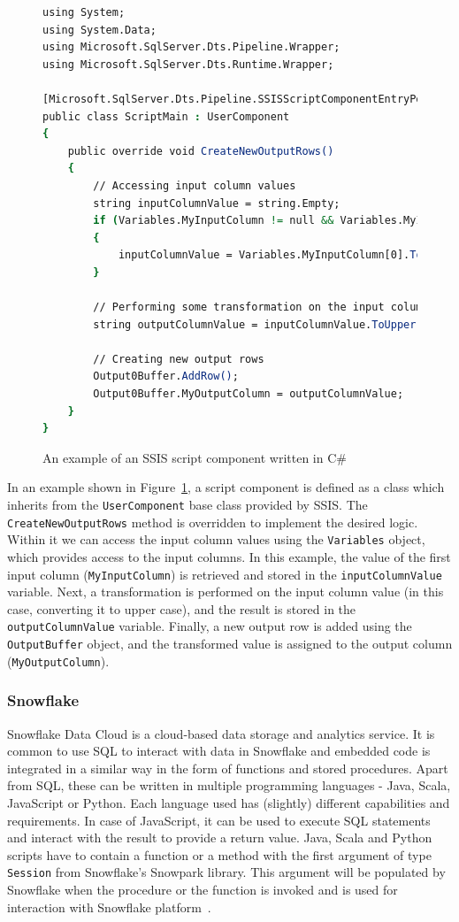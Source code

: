 \begin{figure}[ht]
\begin{lstlisting}[language=csh]
using System;
using System.Data;
using Microsoft.SqlServer.Dts.Pipeline.Wrapper;
using Microsoft.SqlServer.Dts.Runtime.Wrapper;

[Microsoft.SqlServer.Dts.Pipeline.SSISScriptComponentEntryPointAttribute]
public class ScriptMain : UserComponent
{
    public override void CreateNewOutputRows()
    {
        // Accessing input column values
        string inputColumnValue = string.Empty;
        if (Variables.MyInputColumn != null && Variables.MyInputColumn.Length > 0)
        {
            inputColumnValue = Variables.MyInputColumn[0].ToString();
        }

        // Performing some transformation on the input column value
        string outputColumnValue = inputColumnValue.ToUpper();

        // Creating new output rows
        Output0Buffer.AddRow();
        Output0Buffer.MyOutputColumn = outputColumnValue;
    }
}
\end{lstlisting}
\caption{An example of an SSIS script component written in C\#}
\label{fig:cSharpScript}
\end{figure}

\par
In an example shown in Figure~\ref{fig:cSharpScript}, a script component is defined as a class which inherits from the \texttt{UserComponent} base class provided by SSIS. The \texttt{CreateNewOutputRows} method is overridden to implement the desired logic. Within it we can access the input column values using the \texttt{Variables} object, which provides access to the input columns. In this example, the value of the first input column (\texttt{MyInputColumn}) is retrieved and stored in the \texttt{inputColumnValue} variable. Next, a transformation is performed on the input column value (in this case, converting it to upper case), and the result is stored in the \texttt{outputColumnValue} variable. Finally, a new output row is added using the \texttt{OutputBuffer} object, and the transformed value is assigned to the output column (\texttt{MyOutputColumn}).

\subsubsection{Snowflake}
Snowflake Data Cloud is a cloud-based data storage and analytics service. It is common to use SQL to interact with data in Snowflake and embedded code is integrated in a similar way in the form of functions and stored procedures. Apart from SQL, these can be written in multiple programming languages - Java, Scala, JavaScript or Python. Each language used has (slightly) different capabilities and requirements. In case of JavaScript, it can be used to execute SQL statements and interact with the result to provide a return value. Java, Scala and Python scripts have to contain a function or a method with the first argument of type \texttt{Session} from Snowflake's Snowpark library. This argument will be populated by Snowflake when the procedure or the function is invoked and is used for interaction with Snowflake platform~\cite{snowflake}.

